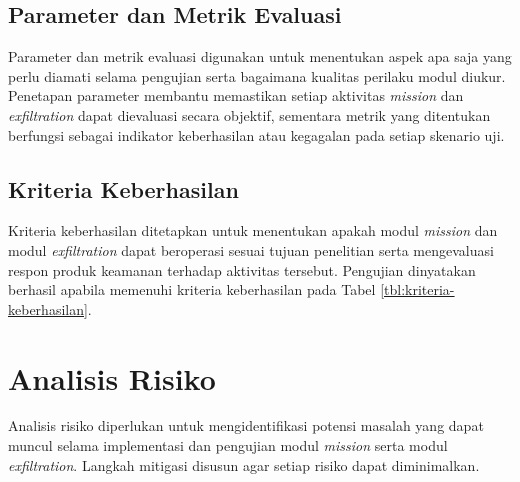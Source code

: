 \subsection{Parameter dan Metrik Evaluasi}

Parameter dan metrik evaluasi digunakan untuk menentukan aspek apa saja yang perlu diamati selama 
pengujian serta bagaimana kualitas perilaku modul diukur. Penetapan parameter membantu memastikan 
setiap aktivitas \textit{mission} dan \textit{exfiltration} dapat dievaluasi secara objektif, 
sementara metrik yang ditentukan berfungsi sebagai indikator keberhasilan atau kegagalan pada setiap 
skenario uji. 



\subsection{Kriteria Keberhasilan}

Kriteria keberhasilan ditetapkan untuk menentukan apakah modul \textit{mission} dan modul \textit{exfiltration} 
dapat beroperasi sesuai tujuan penelitian serta mengevaluasi respon produk keamanan terhadap aktivitas 
tersebut. Pengujian dinyatakan berhasil apabila memenuhi kriteria keberhasilan pada Tabel \ref{tbl:kriteria-keberhasilan}.



\section{Analisis Risiko}

Analisis risiko diperlukan untuk mengidentifikasi potensi masalah yang dapat muncul selama implementasi 
dan pengujian modul \textit{mission} serta modul \textit{exfiltration}. Langkah mitigasi disusun agar 
setiap risiko dapat diminimalkan.

